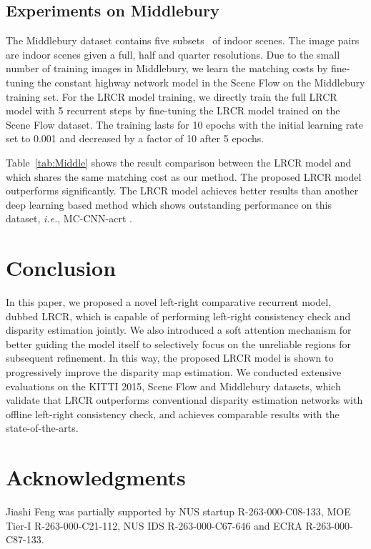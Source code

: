 \documentclass[10pt,twocolumn,letterpaper]{article}
\begin{document}
 










\vspace{-0.2cm}
\subsection{Experiments on Middlebury}
 \label{sec:experimentMIDDLEBURY}
The Middlebury dataset contains five subsets~\cite{scharstein2002middlebury} of indoor scenes. The image pairs are indoor scenes given a full, half and quarter resolutions.  Due to the small number of training images in  Middlebury, we learn the matching costs by fine-tuning the  constant highway network model in the Scene Flow on the Middlebury training set. For the LRCR model training, we directly train the full LRCR model with 5 recurrent steps by fine-tuning the LRCR model trained on the Scene Flow dataset. The training lasts for 10 epochs with the initial learning rate set to 0.001 and decreased by a factor of 10 after 5 epochs.

Table~\ref{tab:Middle} shows the result comparison between the LRCR model and \cite{shaked2016improved} which shares the same matching cost as our method. The proposed LRCR model outperforms \cite{shaked2016improved} significantly. The LRCR model achieves better results than another deep learning based method which  shows outstanding performance on this dataset, \emph{i.e.}, MC-CNN-acrt \cite{zbontar2015computing}.

\vspace{-0.3cm}
\section{Conclusion}
In this paper, we  proposed a novel left-right comparative recurrent model, dubbed  LRCR, which is capable of performing left-right consistency  check and   disparity estimation jointly. We also introduced a soft attention mechanism  for better guiding the model itself to selectively focus on the unreliable regions for subsequent refinement. In this way, the proposed LRCR model is shown to  progressively improve  the disparity map estimation.  We conducted extensive evaluations on the KITTI 2015, Scene Flow and Middlebury datasets, which   validate that LRCR outperforms  conventional disparity estimation networks   with offline left-right consistency check, and achieves comparable results with the state-of-the-arts.

\vspace{-0.2cm}
\section*{Acknowledgments}{
	Jiashi Feng was partially supported by NUS startup R-263-000-C08-133,
	MOE Tier-I R-263-000-C21-112, NUS IDS R-263-000-C67-646 and ECRA R-263-000-C87-133.
}{\small


}
\end{document}
